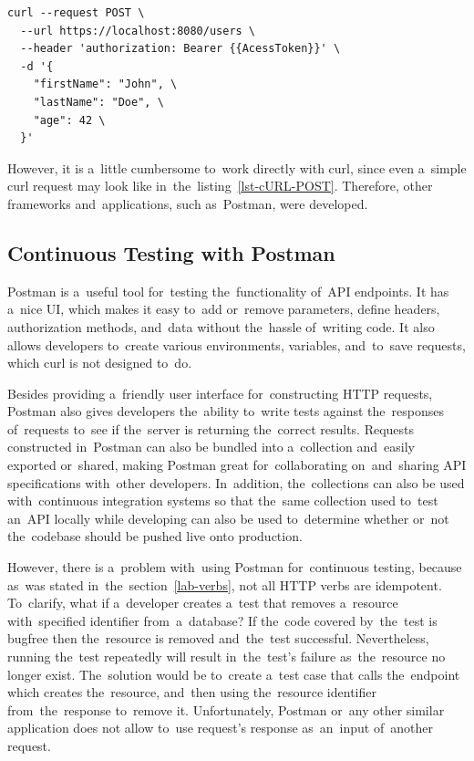 \vspace{1mm}
\begin{lstlisting}[caption=An~example of~POST request that creates
\textit{user} resource on~the~server using API endpoint \textit{/users}.,
label=lst-cURL-POST, style=dp-no-strings, language=XML]
curl --request POST \
  --url https://localhost:8080/users \
  --header 'authorization: Bearer {{AcessToken}}' \
  -d '{
  	"firstName": "John", \ 
  	"lastName": "Doe", \
  	"age": 42 \
  }'
\end{lstlisting}

However, it is a~little cumbersome to~work directly with curl, since even
a~simple curl request may look like in~the~listing~\ref{lst-cURL-POST}.
Therefore, other frameworks and~applications, such as~Postman, were developed.


\subsection{Continuous Testing with Postman}
Postman is a~useful tool for~testing the~functionality of~API endpoints. It has
a~nice UI, which makes it easy to~add or~remove parameters, define headers,
authorization methods, and~data without the~hassle of~writing code. It also
allows developers to~create various environments, variables, and~to~save
requests, which curl is not designed to~do.

Besides providing a~friendly user interface for~constructing HTTP requests,
Postman also gives developers the~ability to~write tests against the~responses
of~requests to~see if the~server is returning the~correct results. Requests
constructed in~Postman can also be bundled into a~collection and~easily exported
or~shared, making Postman great for~collaborating on~and~sharing API
specifications with~other developers. In~addition, the~collections can also be
used with~continuous integration systems so that the~same collection used
to~test an~API locally while developing can also be used to~determine whether
or~not the~codebase should be pushed live onto production.

However, there is a~problem with~using Postman for~continuous testing,
because as~was stated in~the~section~\ref{lab-verbs}, not all HTTP verbs are
idempotent. To~clarify, what if a~developer creates a~test that removes
a~resource with~specified identifier from~a~database? If the~code covered
by~the~test is bugfree then the~resource is removed and~the~test successful.
Nevertheless, running the~test repeatedly will result in~the~test's failure
as~the~resource no longer exist. The~solution would be to~create a~test case
that calls the~endpoint which creates the~resource, and~then using the~resource
identifier from~the~response to~remove it. Unfortunately, Postman or~any other
similar application does not allow to~use request's response as~an~input
of~another request.


